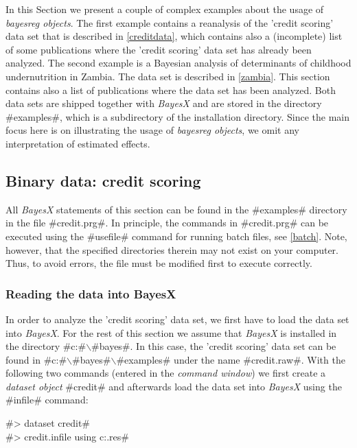 In this Section we present a couple of complex examples about the
usage of {\em bayesreg objects}. The first example contains a
reanalysis of the 'credit scoring' data set that is described in
\autoref{creditdata}, which contains also a (incomplete) list of
some publications where the 'credit scoring' data set has already
been analyzed. The second example is a Bayesian analysis of
determinants of childhood undernutrition in Zambia. The data set is
described in \autoref{zambia}. This section contains also a list of
publications where the data set has been analyzed. Both data sets
are shipped together with {\em BayesX} and are stored in the
directory #examples#, which is a subdirectory of the installation
directory. Since the main focus here is on illustrating the usage of
{\em bayesreg objects}, we omit any interpretation of estimated
effects.


\subsection{Binary data: credit scoring}
\label{creditanalyse}

All {\em BayesX} statements of this section can be found in the
#examples# directory in the file #credit.prg#. In principle, the
commands in #credit.prg# can be executed using the #usefile# command
for running batch files, see \autoref{batch}. Note, however, that
the specified directories therein may not exist on your computer.
Thus, to avoid errors, the file must be modified first to execute
correctly.

\subsubsection{Reading the data into BayesX}


In order to analyze the 'credit scoring' data set, we first have to
load the data set into {\em BayesX}. For the rest of this section we
assume that {\em BayesX} is installed in the directory
#c:#$\backslash$#bayes#. In this case, the 'credit scoring' data set
can be found in #c:#$\backslash$#bayes#$\backslash$#examples# under
the name #credit.raw#. With the following two commands (entered in
the {\em command window}) we first create a {\em dataset object}
#credit# and afterwards load the data set into {\em BayesX} using
the #infile# command:

#> dataset credit# \\
#> credit.infile using c:\bayes\examples\credit.res#

